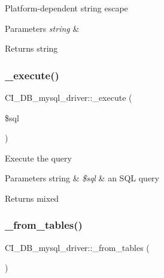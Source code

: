 Platform-\/dependent string escape


\begin{DoxyParams}{Parameters}
{\em string} & \\
\hline
\end{DoxyParams}
\begin{DoxyReturn}{Returns}
string 
\end{DoxyReturn}
\mbox{\label{class_c_i___d_b__mysql__driver_a64efb05060909830650a33b2b5dab6f9}} 
\subsubsection{\texorpdfstring{\+\_\+execute()}{\_execute()}}
{\footnotesize\ttfamily C\+I\+\_\+\+D\+B\+\_\+mysql\+\_\+driver\+::\+\_\+execute (\begin{DoxyParamCaption}\item[{}]{\$sql }\end{DoxyParamCaption})\hspace{0.3cm}{\ttfamily [protected]}}

Execute the query


\begin{DoxyParams}[1]{Parameters}
string & {\em \$sql} & an S\+QL query \\
\hline
\end{DoxyParams}
\begin{DoxyReturn}{Returns}
mixed 
\end{DoxyReturn}
\mbox{\label{class_c_i___d_b__mysql__driver_a7fa75cf58a8cfa276e3bf396eea369d8}} 
\subsubsection{\texorpdfstring{\+\_\+from\+\_\+tables()}{\_from\_tables()}}
{\footnotesize\ttfamily C\+I\+\_\+\+D\+B\+\_\+mysql\+\_\+driver\+::\+\_\+from\+\_\+tables (\begin{DoxyParamCaption}{ }\end{DoxyParamCaption})\hspace{0.3cm}{\ttfamily [protected]}}

